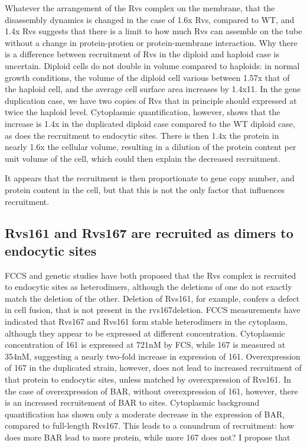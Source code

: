 Whatever the arrangement of the Rvs complex on the membrane, that the disassembly dynamics is changed in the case of 1.6x Rvs, compared to WT, and 1.4x Rvs suggests that there is a limit to how much Rvs can assemble on the tube without a change in protein-protien or protein-membrane interaction. Why there is a difference between recruitment of Rvs in the diploid and haploid case is uncertain. Diploid cells do not double in volume compared to haploids: in normal growth conditions, the volume of the diploid cell various between 1.57x that of the haploid cell, and the average cell surface area increases by 1.4x11. In the gene duplication case, we have two copies of Rvs that in principle should expressed at twice the haploid level. Cytoplasmic quantification, however, shows that the increase is 1.4x in the duplicated diploid case compared to the WT diploid case, as does the recruitment to endocytic sites. There is then 1.4x the protein in nearly 1.6x the cellular volume, resulting in a dilution of the protein content per unit volume of the cell, which could then explain the decreased recruitment. 

It appears that the recruitment is then proportionate to gene copy number, and protein content in the cell, but that this is not the only factor that influences recruitment. 


\subsection{Rvs161 and Rvs167 are recruited as dimers to endocytic sites}
FCCS and genetic studies have both proposed that the Rvs complex is recruited to endocytic sites as heterodimers, although the deletions of one do not exactly match the deletion of the other. Deletion of Rvs161, for example, confers a defect in cell fusion, that is not present in the rvs167deletion. FCCS measurements have indicated that Rvs167 and Rvs161 form stable heterodimers in the cytoplasm, although they appear to be expressed at different concentration. Cytoplasmic concentration of 161 is expressed at 721nM by FCS, while 167 is measured at 354nM, suggesting a nearly two-fold increase in expression of 161. Overexpression of 167 in the duplicated strain, however, does not lead to increased recruitment of that protein to endocytic sites, unless matched by overexpression of Rvs161. In the case of overexpression of BAR, without overexpression of 161, however, there is an increased recruitement of BAR to sites. Cytoplasmic background quantification has shown only a moderate decrease in the expression of BAR, compared to full-length Rvs167. This leads to a conundrum of recruitment: how does more BAR lead to more protein, while more 167 does not? I propose that 

